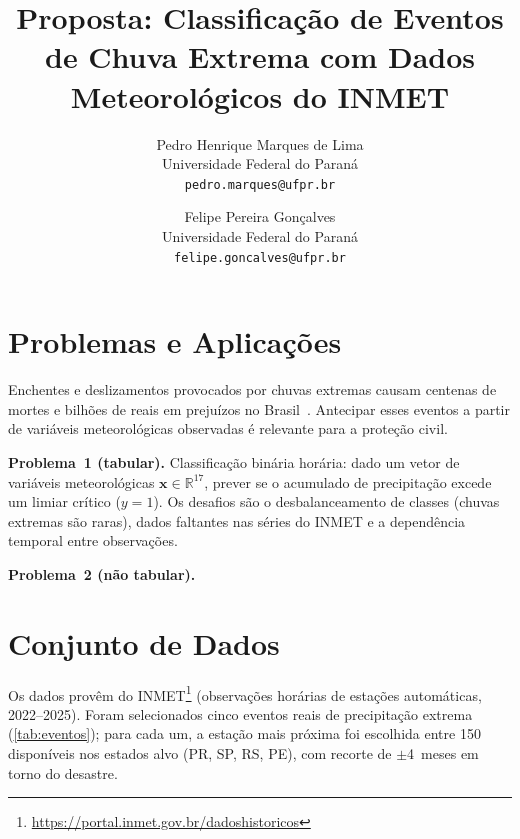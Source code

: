 \documentclass[10pt,twocolumn,letterpaper]{article}
\begin{document}
\title{Proposta: Classificação de Eventos de Chuva Extrema
com Dados Meteorológicos do INMET}

\author{
Pedro Henrique Marques de Lima \\
Universidade Federal do Paraná \\
{\tt\small pedro.marques@ufpr.br}
\and
Felipe Pereira Gonçalves \\
Universidade Federal do Paraná \\
{\tt\small felipe.goncalves@ufpr.br}
}
\maketitle

\section{Problemas e Aplicações}

Enchentes e deslizamentos provocados por chuvas extremas causam
centenas de mortes e bilhões de reais em prejuízos no
Brasil~\cite{marengo2020trends,cenad2024}. Antecipar esses eventos a
partir de variáveis meteorológicas observadas é relevante para a
proteção civil.

\textbf{Problema~1 (tabular).}
Classificação binária horária: dado um vetor de variáveis
meteorológicas $\mathbf{x}\!\in\!\mathbb{R}^{17}$, prever se o
acumulado de precipitação excede um limiar crítico ($y\!=\!1$).
Os desafios são o desbalanceamento de classes (chuvas extremas são
raras), dados faltantes nas séries do INMET e a dependência temporal
entre observações.

\textbf{Problema~2 (não tabular).}


\section{Conjunto de Dados}

Os dados provêm do INMET\footnote{\url{https://portal.inmet.gov.br/dadoshistoricos}}
(observações horárias de estações automáticas, 2022--2025). Foram
selecionados cinco eventos reais de precipitação extrema
(\cref{tab:eventos}); para cada um, a estação mais próxima foi
escolhida entre 150 disponíveis nos estados alvo (PR, SP, RS, PE),
com recorte de $\pm$4~meses em torno do desastre.
\end{document}
